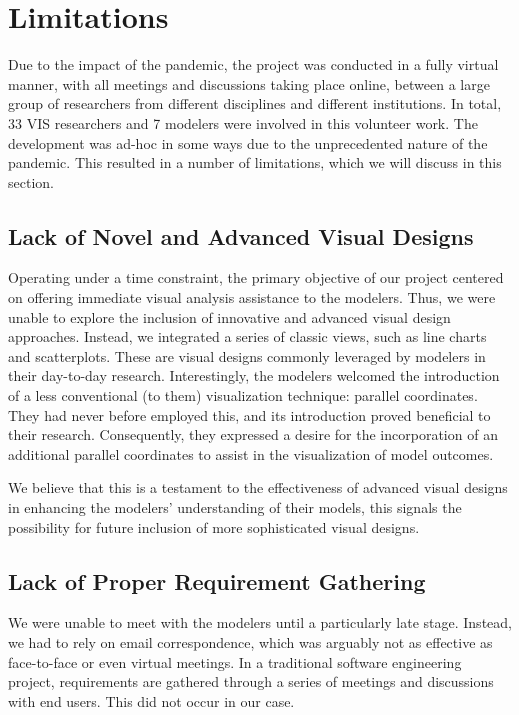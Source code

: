 \section{Limitations}

Due to the impact of the pandemic, the project was conducted in a fully virtual manner, with all meetings and discussions taking place online, between a large group of researchers from different disciplines and different institutions.
In total, 33 VIS researchers and 7 modelers were involved in this volunteer work.
The development was ad-hoc in some ways due to the unprecedented nature of the pandemic.
This resulted in a number of limitations, which we will discuss in this section.

\subsection{Lack of Novel and Advanced Visual Designs}
Operating under a time constraint, the primary objective of our project centered on offering immediate visual analysis assistance to the modelers.
Thus, we were unable to explore the inclusion of innovative and advanced visual design approaches.
Instead, we integrated a series of classic views, such as line charts and scatterplots.
These are visual designs commonly leveraged by modelers in their day-to-day research.
Interestingly, the modelers welcomed the introduction of a less conventional (to them) visualization technique: parallel coordinates.
They had never before employed this, and its introduction proved beneficial to their research.
Consequently, they expressed a desire for the incorporation of an additional parallel coordinates to assist in the visualization of model outcomes.

We believe that this is a testament to the effectiveness of advanced visual designs in enhancing the modelers' understanding of their models, this signals the possibility for future inclusion of more sophisticated visual designs.

\subsection{Lack of Proper Requirement Gathering}
We were unable to meet with the modelers until a particularly late stage. Instead, we had to rely on email correspondence, which was arguably not as effective as face-to-face or even virtual meetings.
In a traditional software engineering project, requirements are gathered through a series of meetings and discussions with end users. This did not occur in our case.

